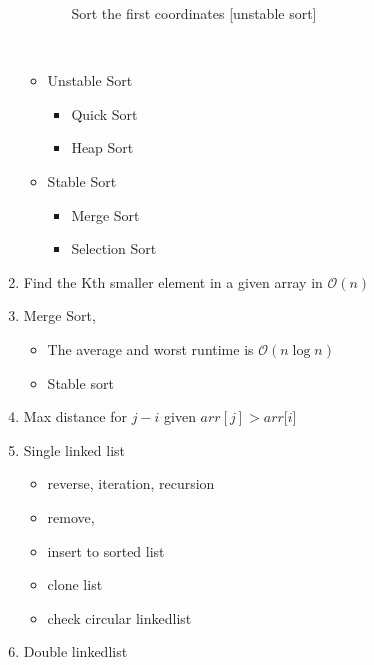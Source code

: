 \documentclass{article}
\begin{document}
\begin{enumerate}
\begin{itemize}
\begin{itemize}
              Sort the first coordinates [unstable sort]\\
                \\
        \end{itemize} 
        \item Unstable Sort 
            \begin{itemize}
            \item Quick Sort 
            \item Heap Sort
            \end{itemize} 
        \item Stable Sort 
            \begin{itemize}
            \item Merge Sort 
            \item Selection Sort 
            \end{itemize} 
    \end{itemize} 
\item Find the Kth smaller element in a given array in $\mathcal{O}(n)$
\item Merge Sort, 
    \begin{itemize}
    \item The average and worst runtime is $\mathcal{O}(n\log{}n)$ 
    \item Stable sort
    \end{itemize} 
\item Max distance for $j - i$ given $arr[j] > arr[i$] 
\item Single linked list
    \begin{itemize}
        \item reverse, iteration, recursion
        \item remove, 
        \item insert to sorted list 
        \item clone list
        \item check circular linkedlist 
    \end{itemize} 
\item Double linkedlist

\end{enumerate}
\end{document}
